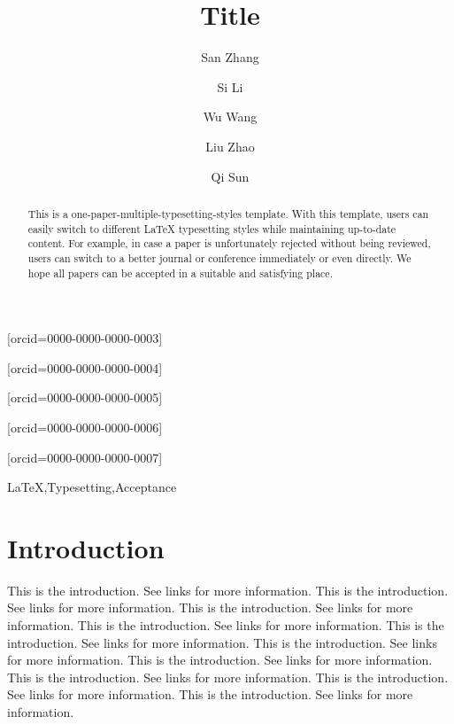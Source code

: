 \documentclass[a4paper,fleqn]{cas-dc}
\begin{document}
\title[mode=title]{Title}

\author[1,2,3]{San Zhang}[orcid=0000-0000-0000-0003]\fnmark[1]

\author[1,2]{Si Li}[orcid=0000-0000-0000-0004]\fnmark[1]

\author[1]{Wu Wang}[orcid=0000-0000-0000-0005]

\author[1]{Liu Zhao}[orcid=0000-0000-0000-0006]\cormark[1]

\author[1]{Qi Sun}[orcid=0000-0000-0000-0007]\cormark[1]

\address[1]{Affiliation A}
\address[2]{Affiliation B}
\address[3]{Affiliation C}


\begin{abstract}
	This is a one-paper-multiple-typesetting-styles template. With this template, users can easily switch to different LaTeX typesetting styles while maintaining up-to-date content. For example, in case a paper is unfortunately rejected without being reviewed, users can switch to a better journal or conference immediately or even directly. We hope all papers can be accepted in a suitable and satisfying place. 
\end{abstract}

\begin{keywords}
	LaTeX\sep{}Typesetting\sep{}Acceptance
\end{keywords}

\maketitle

\section{Introduction}
\label{sec:1}

This is the introduction. See links \cite{liu2024efficient, yang2026builder, yang2025checker} for more information. This is the introduction. See links \cite{liu2024efficient, yang2026builder, yang2025checker} for more information. This is the introduction. See links \cite{liu2024efficient, yang2026builder, yang2025checker} for more information. This is the introduction. See links \cite{liu2024efficient, yang2026builder, yang2025checker} for more information. This is the introduction. See links \cite{liu2024efficient, yang2026builder, yang2025checker} for more information. This is the introduction. See links \cite{liu2024efficient, yang2026builder, yang2025checker} for more information. This is the introduction. See links \cite{liu2024efficient, yang2026builder, yang2025checker} for more information. This is the introduction. See links \cite{liu2024efficient, yang2026builder, yang2025checker} for more information. This is the introduction. See links \cite{liu2024efficient, yang2026builder, yang2025checker} for more information. This is the introduction. See links \cite{liu2024efficient, yang2026builder, yang2025checker} for more information. 
\end{document}
